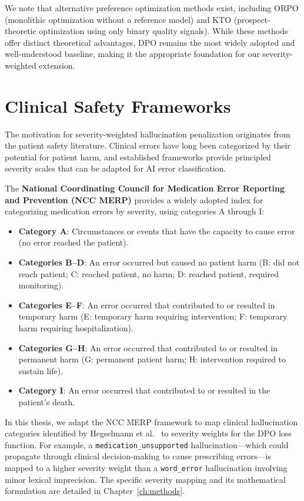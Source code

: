 \documentclass[12pt,a4paper,oneside]{report}
\begin{document}
We note that alternative preference optimization methods exist, including ORPO \cite{hong2024orpo} (monolithic optimization without a reference model) and KTO \cite{ethayarajh2024kto} (prospect-theoretic optimization using only binary quality signals). While these methods offer distinct theoretical advantages, DPO remains the most widely adopted and well-understood baseline, making it the appropriate foundation for our severity-weighted extension.


\section{Clinical Safety Frameworks}
\label{sec:safety-frameworks}

The motivation for severity-weighted hallucination penalization originates from the patient safety literature. Clinical errors have long been categorized by their potential for patient harm, and established frameworks provide principled severity scales that can be adapted for AI error classification.

The \textbf{National Coordinating Council for Medication Error Reporting and Prevention (NCC MERP)} \cite{nccmerp2001} provides a widely adopted index for categorizing medication errors by severity, using categories A through I:

\begin{itemize}
    \item \textbf{Category A}: Circumstances or events that have the capacity to cause error (no error reached the patient).
    \item \textbf{Categories B--D}: An error occurred but caused no patient harm (B: did not reach patient; C: reached patient, no harm; D: reached patient, required monitoring).
    \item \textbf{Categories E--F}: An error occurred that contributed to or resulted in temporary harm (E: temporary harm requiring intervention; F: temporary harm requiring hospitalization).
    \item \textbf{Categories G--H}: An error occurred that contributed to or resulted in permanent harm (G: permanent patient harm; H: intervention required to sustain life).
    \item \textbf{Category I}: An error occurred that contributed to or resulted in the patient's death.
\end{itemize}

In this thesis, we adapt the NCC MERP framework to map clinical hallucination categories identified by Hegselmann et al.~\cite{hegselmann2024datacentric} to severity weights for the DPO loss function. For example, a \texttt{medication\_unsupported} hallucination---which could propagate through clinical decision-making to cause prescribing errors---is mapped to a higher severity weight than a \texttt{word\_error} hallucination involving minor lexical imprecision. The specific severity mapping and its mathematical formulation are detailed in Chapter~\ref{ch:methods}.
\end{document}
